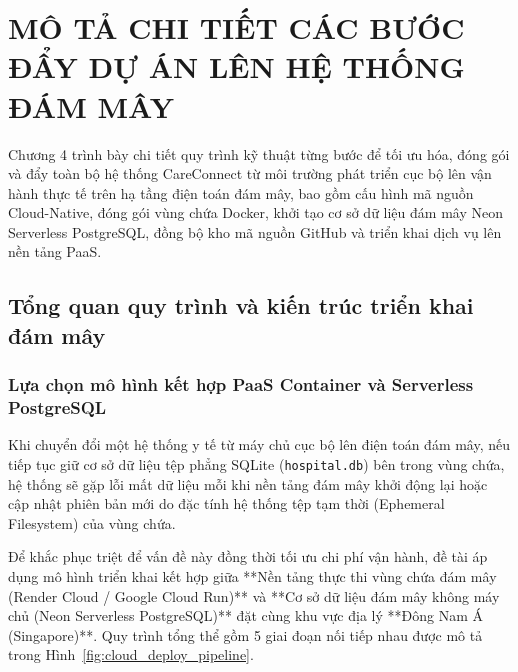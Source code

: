 \chapter{MÔ TẢ CHI TIẾT CÁC BƯỚC ĐẨY DỰ ÁN LÊN HỆ THỐNG ĐÁM MÂY}

Chương 4 trình bày chi tiết quy trình kỹ thuật từng bước để tối ưu hóa, đóng gói và đẩy toàn bộ hệ thống CareConnect từ môi trường phát triển cục bộ lên vận hành thực tế trên hạ tầng điện toán đám mây, bao gồm cấu hình mã nguồn Cloud-Native, đóng gói vùng chứa Docker, khởi tạo cơ sở dữ liệu đám mây Neon Serverless PostgreSQL, đồng bộ kho mã nguồn GitHub và triển khai dịch vụ lên nền tảng PaaS.

\section{Tổng quan quy trình và kiến trúc triển khai đám mây}

\subsection{Lựa chọn mô hình kết hợp PaaS Container và Serverless PostgreSQL}

Khi chuyển đổi một hệ thống y tế từ máy chủ cục bộ lên điện toán đám mây, nếu tiếp tục giữ cơ sở dữ liệu tệp phẳng SQLite (\texttt{hospital.db}) bên trong vùng chứa, hệ thống sẽ gặp lỗi mất dữ liệu mỗi khi nền tảng đám mây khởi động lại hoặc cập nhật phiên bản mới do đặc tính hệ thống tệp tạm thời (Ephemeral Filesystem) của vùng chứa.

Để khắc phục triệt để vấn đề này đồng thời tối ưu chi phí vận hành, đề tài áp dụng mô hình triển khai kết hợp giữa **Nền tảng thực thi vùng chứa đám mây (Render Cloud / Google Cloud Run)** và **Cơ sở dữ liệu đám mây không máy chủ (Neon Serverless PostgreSQL)** đặt cùng khu vực địa lý **Đông Nam Á (Singapore)**. Quy trình tổng thể gồm 5 giai đoạn nối tiếp nhau được mô tả trong Hình~\ref{fig:cloud_deploy_pipeline}.

